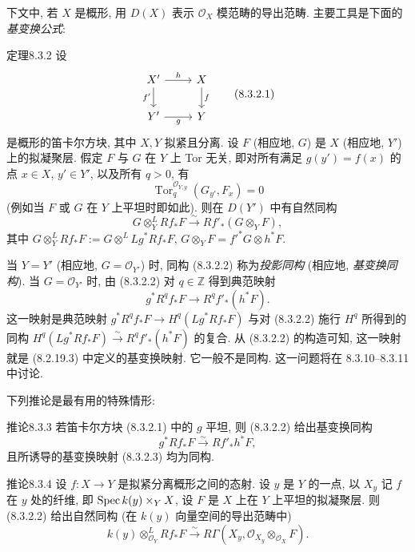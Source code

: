 下文中, 若 $X$ 是概形, 用 $D(X)$ 表示 $\mathcal O_X$ 模范畴的导出范畴. 主要工具是下面的\emph{基变换公式}:
\begin{origstatement}{定理}{8.3.2}\label{ch08:th832}
设
\begin{equation}
\begin{tikzcd}X'\arrow[r,"h"]\arrow[d,"f'"']&X\arrow[d,"f"]\\Y'\arrow[r,"g"']&Y\end{tikzcd}
\tag{8.3.2.1}\label{ch08:eq8321}\end{equation}
是概形的笛卡尔方块, 其中 $X,Y$ 拟紧且分离. 设 $F$ (相应地, $G$) 是 $X$ (相应地, $Y'$) 上的拟凝聚层. 假定 $F$ 与 $G$ 在 $Y$ 上 Tor 无关, 即对所有满足 $g(y')=f(x)$ 的点 $x\in X$, $y'\in Y'$, 以及所有 $q>0$, 有
\[\operatorname{Tor}_q^{\mathcal O_{Y,y}}(G_{y'},F_x)=0\]
(例如当 $F$ 或 $G$ 在 $Y$ 上平坦时即如此). 则在 $D(Y')$ 中有自然同构
\begin{equation}G\otimes_Y^LRf_*F\xrightarrow\sim Rf'_*(G\otimes_YF),\tag{8.3.2.2}\label{ch08:eq8322}\end{equation}
其中 $G\otimes_Y^LRf_*F:=G\otimes^LLg^*Rf_*F$, $G\otimes_YF=f'^*G\otimes h^*F$.
\end{origstatement}
当 $Y=Y'$ (相应地, $G=\mathcal O_{Y'}$) 时, 同构 (8.3.2.2) 称为\emph{投影同构} (相应地, \emph{基变换同构}). 当 $G=\mathcal O_{Y'}$ 时, 由 (8.3.2.2) 对 $q\in\mathbb Z$ 得到典范映射
\begin{equation}g^*R^qf_*F\longrightarrow R^qf'_*(h^*F).\tag{8.3.2.3}\label{ch08:eq8323}\end{equation}
这一映射是典范映射 $g^*R^qf_*F\to H^q(Lg^*Rf_*F)$ 与对 (8.3.2.2) 施行 $H^q$ 所得到的同构 $H^q(Lg^*Rf_*F)\xrightarrow\sim R^qf'_*(h^*F)$ 的复合. 从 (8.3.2.2) 的构造可知, 这一映射就是 (8.2.19.3) 中定义的基变换映射. 它一般不是同构. 这一问题将在 8.3.10--8.3.11 中讨论.

下列推论是最有用的特殊情形:
\begin{origstatement}{推论}{8.3.3}\label{ch08:cor833}
若笛卡尔方块 (8.3.2.1) 中的 $g$ 平坦, 则 (8.3.2.2) 给出基变换同构
\[g^*Rf_*F\xrightarrow\sim Rf'_*h^*F,\]
且所诱导的基变换映射 (8.3.2.3) 均为同构.
\end{origstatement}

\begin{origstatement}{推论}{8.3.4}\label{ch08:cor834}
设 $f:X\to Y$ 是拟紧分离概形之间的态射. 设 $y$ 是 $Y$ 的一点, 以 $X_y$ 记 $f$ 在 $y$ 处的纤维, 即 $\operatorname{Spec} k(y)\times_YX$, 设 $F$ 是 $X$ 上在 $Y$ 上平坦的拟凝聚层. 则 (8.3.2.2) 给出自然同构 (在 $k(y)$ 向量空间的导出范畴中)
\[k(y)\otimes_{\mathcal O_Y}^LRf_*F\xrightarrow\sim R\Gamma(X_y,\mathcal O_{X_y}\otimes_{\mathcal O_X}F).\]
\end{origstatement}

